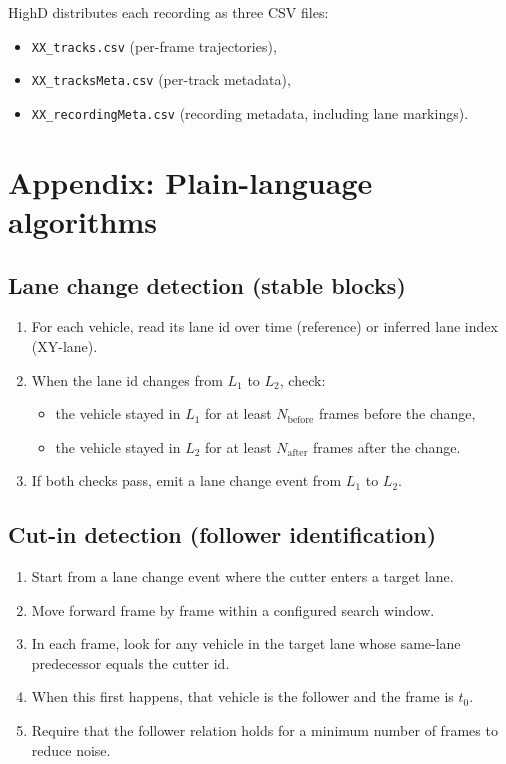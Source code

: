 \documentclass[12pt,a4paper,twoside,openright]{report}
\begin{document}
    HighD distributes each recording as three CSV files:
    \begin{itemize}[leftmargin=1.2em]
  \item \texttt{XX\_tracks.csv} (per-frame trajectories),
  \item \texttt{XX\_tracksMeta.csv} (per-track metadata),
  \item \texttt{XX\_recordingMeta.csv} (recording metadata, including lane markings).
    \end{itemize}

    \chapter{Appendix: Plain-language algorithms}

    \section{Lane change detection (stable blocks)}
    \begin{enumerate}[leftmargin=1.6em]
  \item For each vehicle, read its lane id over time (reference) or inferred lane index (XY-lane).
  \item When the lane id changes from $L_1$ to $L_2$, check:
  \begin{itemize}[leftmargin=1.2em]
    \item the vehicle stayed in $L_1$ for at least $N_\text{before}$ frames before the change,
    \item the vehicle stayed in $L_2$ for at least $N_\text{after}$ frames after the change.
  \end{itemize}
  \item If both checks pass, emit a lane change event from $L_1$ to $L_2$.
    \end{enumerate}

    \section{Cut-in detection (follower identification)}
    \begin{enumerate}[leftmargin=1.6em]
  \item Start from a lane change event where the cutter enters a target lane.
  \item Move forward frame by frame within a configured search window.
  \item In each frame, look for any vehicle in the target lane whose same-lane predecessor equals the cutter id.
  \item When this first happens, that vehicle is the follower and the frame is $t_0$.
  \item Require that the follower relation holds for a minimum number of frames to reduce noise.
    \end{enumerate}
\end{document}
